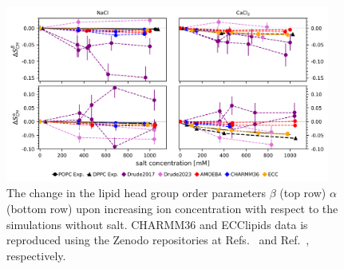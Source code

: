 \documentclass[journal=jctcce,manuscript=article,layout=singlecolumn]{achemso}
\begin{document}
\begin{figure}[!hbt]
	\centering
	\includegraphics[width=0.95\textwidth]{Figures/order_parameter_change.png}
	\caption{The change in the lipid head group order parameters $\beta$ (top row) $\alpha$ (bottom row) upon increasing ion concentration with respect to the simulations without salt. CHARMM36 and ECClipids data is reproduced using the Zenodo repositories at Refs.~ and Ref.~, respectively.}
	\label{fig:popc_order_parameter_change}
\end{figure}
\end{document}
